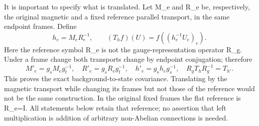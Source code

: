 \documentclass[
  11pt,
]{article}
\begin{document}
It is important to specify what is translated. Let M\_e and R\_e be,
respectively, the original magnetic and a fixed reference parallel
transport, in the same endpoint frames. Define \[
 h_e=M_eR_e^{-1},\qquad (T_hf)(U)=f((h_e^{-1}U_e)_e).
\tag{1.2}
\] Here the reference symbol R\_e is not the gauge-representation
operator R\_g. Under a frame change both transports change by endpoint
conjugation; therefore \[
 M'_e=g_sM_eg_t^{-1},\quad R'_e=g_sR_eg_t^{-1},\quad
 h'_e=g_sh_eg_s^{-1},\quad R_gT_hR_g^{-1}=T_{h'}.
\tag{1.3}
\] This proves the exact background-to-state covariance. Translating by
the magnetic transport while changing its frames but not those of the
reference would not be the same construction. In the original fixed
frames the flat reference is R\_e=I. All statements below retain that
reference; no assertion that left multiplication is addition of
arbitrary non-Abelian connections is needed.
\end{document}
